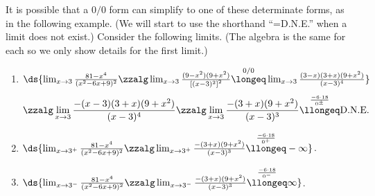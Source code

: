 It is possible that a $0/0$ form can simplify to one of these
determinate forms, as in the following example.
(We will start to use the shorthand ``=D.N.E.'' when a limit
does not exist.) 
\bex Consider the following limits. (The algebra is the same for each
     so we only show details for the first limit.)
\begin{enumerate}
\item $\ds{\lim_{x\to3}\frac{81-x^4}{(x^2-6x+9)^2}
        \zzalg\lim_{x\to3}\frac{(9-x^2)(9+x^2)}{\left[(x-3)^2
           \right]^2} 
        \overset{0/0}\longeq\lim_{x\to3}\frac{(3-x)(3+x)(9+x^2)}
       {(x-3)^4}}$
$$      \zzalg\lim_{x\to3}\frac{-(x-3)(3+x)(9+x^2)}{(x-3)^4}
        \zzalg\lim_{x\to3}\frac{-(3+x)(9+x^2)}{(x-3)^3}
       \overset{\frac{-6\cdot18}{0^\pm}}\llongeq\text{D.N.E.}$$
\item $\ds{\lim_{x\to3^+}\frac{81-x^4}{(x^2-6x+9)^2}\zzalg
        \lim_{x\to3^+}\frac{-(3+x)(9+x^2)}{(x-3)^3}
       \overset{\frac{-6\cdot18}{0^+}}\llongeq-\infty}$.
\item $\ds{\lim_{x\to3^-}\frac{81-x^4}{(x^2-6x+9)^2}\zzalg
        \lim_{x\to3^-}\frac{-(3+x)(9+x^2)}{(x-3)^3}
       \overset{\frac{-6\cdot18}{0^-}}\llongeq\infty}$.
\end{enumerate}
\eex


